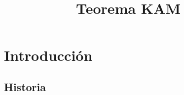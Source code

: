 \documentclass[8pt]{beamer}
\title[Teorema KAM] 
{\huge {Teorema KAM}}
\renewcommand{\>}{\rangle}
\newcommand{\<}{\langle}
\begin{document}
\begin{frame}

\titlepage 

\end{frame}

\section[Introducción]{Introducción}

\subsection[Historia]{Historia}

\begin{frame}
{}
\vspace{-5cm}


\end{frame}
\end{document}
